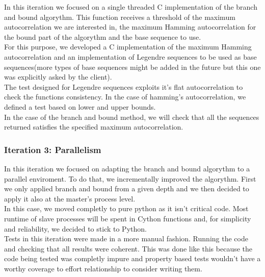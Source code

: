       In this iteration we focused on a single threaded C implementation of the
      branch and bound algorythm. This function receives a threshold of the
      maximum autocorrelation we are interested in, the maximum Hamming
      autocorrelation for the bound part of the algorythm and the base sequence
      to use.\\

      For this purpose, we developed a C implementation of the maximum Hamming
      autocorrelation and an implementation of Legendre sequences to be used
      as base sequences(more types of base sequences might be added in the
      future but this one was explicitly asked by the client).\\

      The test designed for Legendre sequences exploits it's flat
      autocorrelation to check the functions consistency. In the case of
      hamming's autocorrelation, we defined a test based on lower and upper
      bounds.\\

      In the case of the branch and bound method, we will check that all the
      sequences returned satisfies the specified maximum autocorrelation.\\

      \subsubsection{Iteration 3: Parallelism}

      In this iteration we focused on adapting the branch and bound algorythm
      to a parallel enviroment. To do that, we incrementally improved the
      algorythm. First we only applied branch and bound from a given depth and
      we then decided to apply it also at the master's process level.\\

      In this case, we moved completly to pure python as it isn't critical
      code. Most runtime of slave processes will be spent in Cython functions
      and, for simplicity and reliability, we decided to stick to Python.\\

      Tests in this iteration were made in a more manual fashion. Running the
      code and checking that all results were coherent. This was done like
      this because the code being tested was completly impure and property
      based tests wouldn't have a worthy coverage to effort relationship to
      consider writing them.\\

